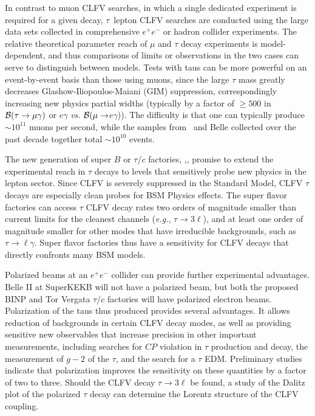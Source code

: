 In contrast to muon CLFV searches, in which a single dedicated experiment is required for a given decay,  $\tau$~lepton CLFV searches are conducted using the large data sets collected in comprehensive $e^+e^-$ or hadron collider experiments. The relative theoretical parameter reach of $\mu$ and $\tau$ decay experiments is model-dependent, and thus comparisons of limits or observations in the two cases can serve to distinguish between models.
Tests with taus can be more powerful on an event-by-event basis than those using muons, since the large $\tau$ mass greatly decreases 
Glashow-Iliopoulos-Maiani (GIM) suppression, correspondingly increasing new physics partial widths (typically by a factor of $\geq 500$ in $\cal{B}(\tau \rightarrow \mu \gamma)$ or $e \gamma$ {\it vs.} $\cal{B}(\mu \rightarrow$$e \gamma$)).  The difficulty is that one can typically produce $\sim 10^{11}$ muons per second, while the samples from \babar\ and Belle collected over the past decade together total $\sim 10^{10}$ events.  

The new generation of super $B$ or $\tau$/$c$ factories, \cite{superkekb},\cite{Blinov:2009zzd},\cite{tc} promise to extend the
experimental reach in $\tau$ decays to levels that sensitively
probe new physics in the lepton sector. Since CLFV is severely suppressed in the Standard Model, CLFV $\tau$ decays
are especially clean probes for BSM Physics
effects.  The
super flavor factories can access $\tau$ CLFV decay rates two orders of magnitude smaller than current limits for the cleanest channels
({\it e.g.}, $\tau\to 3\ell$), and at least one order of magnitude smaller for other
modes that have irreducible backgrounds, such as $\tau\to \ell\gamma$. Super flavor factories thus have a sensitivity for CLFV decays that directly confronts many BSM models. 

Polarized beams at an $e^+e^-$ collider can provide further
experimental advantages.   Belle II at \hbox{SuperKEKB} will not have a polarized beam, but both the proposed BINP and Tor Vergata $\tau$/$c$ factories will have polarized electron beams.  Polarization of the taus thus produced provides several advantages. It allows reduction of backgrounds in certain
CLFV decay modes, as well as providing sensitive new
observables that increase precision in other important measurements, including
searches for $C\!P$ violation in $\tau$ production and decay, the measurement
of $g-2$ of the $\tau$, and the search for a $\tau$ EDM.  Preliminary studies indicate that polarization improves the sensitivity on these quantities by a factor of two to three. Should the CLFV decay $\tau \rightarrow 3\ell$ be found, a study of the Dalitz plot of the polarized $\tau$ decay can determine the Lorentz structure of the CLFV coupling.

